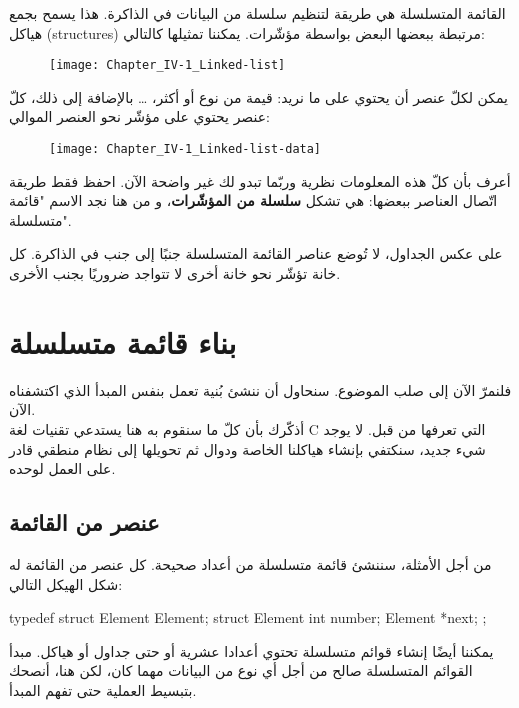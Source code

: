 القائمة المتسلسلة هي طريقة لتنظيم سلسلة من البيانات في الذاكرة. هذا يسمح بجمع هياكل
(\textenglish{structures})
مرتبطة ببعضها البعض بواسطة مؤشّرات. يمكننا تمثيلها كالتالي:

\begin{figure}[H]
	\centering
	\texttt{[image: Chapter\_IV-1\_Linked-list]}
\end{figure}

يمكن لكلّ عنصر أن يحتوي على ما نريد: قيمة من نوع 
أو أكثر،
\dots
بالإضافة إلى ذلك، كلّ عنصر يحتوي على مؤشّر نحو العنصر الموالي:

\begin{figure}[H]
	\centering
	\texttt{[image: Chapter\_IV-1\_Linked-list-data]}
\end{figure}

أعرف بأن كلّ هذه المعلومات نظرية وربّما تبدو لك غير واضحة الآن. احفظ فقط طريقة اتّصال العناصر ببعضها: هي تشكل 
\textbf{سلسلة من المؤشّرات}،
و من هنا نجد الاسم "قائمة متسلسلة". 

\begin{information}
على عكس الجداول، لا تُوضع عناصر القائمة المتسلسلة جنبًا إلى جنب في الذاكرة. كل خانة تؤشّر نحو خانة أخرى لا تتواجد ضروريًا بجنب الأخرى.
\end{information}

\section{بناء قائمة متسلسلة}

فلنمرّ الآن إلى صلب الموضوع. سنحاول أن ننشئ بُنية تعمل بنفس المبدأ الذي اكتشفناه الآن.\\
أذكّرك بأن كلّ ما سنقوم به هنا يستدعي تقنيات لغة
\textenglish{C}
 التي تعرفها من قبل. لا يوجد شيء جديد، سنكتفي بإنشاء هياكلنا الخاصة ودوال ثم تحويلها إلى نظام منطقي قادر على العمل لوحده.

\subsection{عنصر من القائمة}

من أجل الأمثلة، سننشئ قائمة متسلسلة من أعداد صحيحة. كل عنصر من القائمة له شكل الهيكل التالي:

\begin{Csource}
typedef struct Element Element;
struct Element
{
	int number;
	Element *next;
};
\end{Csource}

\begin{information}
يمكننا أيضًا إنشاء قوائم متسلسلة تحتوي أعدادا عشرية أو حتى جداول أو هياكل. مبدأ القوائم المتسلسلة صالح من أجل أي نوع من البيانات مهما كان، لكن هنا، أنصحك بتبسيط العملية حتى تفهم المبدأ.
\end{information}

